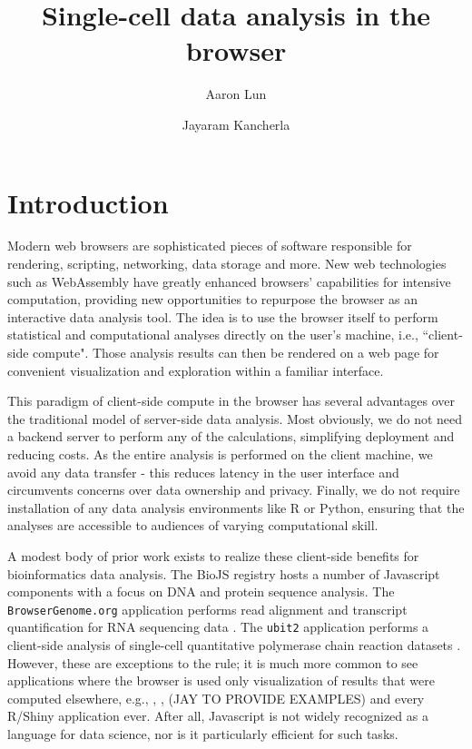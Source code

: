 \documentclass{article}
\title{Single-cell data analysis in the browser}
\author[1]{Aaron Lun}
\affil[1]{Genentech, Inc. South San Francisco, CA}
\author[1]{Jayaram Kancherla}
\begin{document}
\maketitle

\newcommand{\code}[1]{\texttt{#1}}

\section{Introduction}

Modern web browsers are sophisticated pieces of software responsible for rendering, scripting, networking, data storage and more.
New web technologies such as WebAssembly \cite{haas2017bringing} have greatly enhanced browsers' capabilities for intensive computation,
providing new opportunities to repurpose the browser as an interactive data analysis tool.
The idea is to use the browser itself to perform statistical and computational analyses directly on the user's machine, i.e., ``client-side compute". 
Those analysis results can then be rendered on a web page for convenient visualization and exploration within a familiar interface.

This paradigm of client-side compute in the browser has several advantages over the traditional model of server-side data analysis.
Most obviously, we do not need a backend server to perform any of the calculations, simplifying deployment and reducing costs.
As the entire analysis is performed on the client machine, we avoid any data transfer - this reduces latency in the user interface and circumvents concerns over data ownership and privacy.
Finally, we do not require installation of any data analysis environments like R or Python, ensuring that the analyses are accessible to audiences of varying computational skill.

A modest body of prior work exists to realize these client-side benefits for bioinformatics data analysis.
The BioJS registry hosts a number of Javascript components \cite{gomez2013biojs} with a focus on DNA and protein sequence analysis.
The \code{BrowserGenome.org} application performs read alignment and transcript quantification for RNA sequencing data \cite{schmid2015browsergenome}.
The \code{ubit2} application performs a client-side analysis of single-cell quantitative polymerase chain reaction datasets \cite{fan2017ubit2}.
However, these are exceptions to the rule; it is much more common to see applications where the browser is used only visualization of results that were computed elsewhere,
e.g., \cite{megill2021cellxgene}, \cite{chelaru2014epiviz}, (JAY TO PROVIDE EXAMPLES) and every R/Shiny application ever.
After all, Javascript is not widely recognized as a language for data science, nor is it particularly efficient for such tasks.
\end{document}
